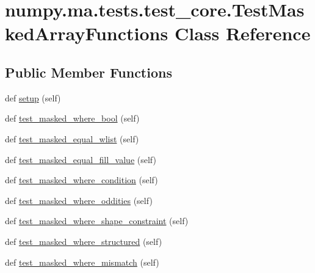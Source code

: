 \hypertarget{classnumpy_1_1ma_1_1tests_1_1test__core_1_1TestMaskedArrayFunctions}{}\section{numpy.\+ma.\+tests.\+test\+\_\+core.\+Test\+Masked\+Array\+Functions Class Reference}
\label{classnumpy_1_1ma_1_1tests_1_1test__core_1_1TestMaskedArrayFunctions}
\subsection*{Public Member Functions}
\begin{DoxyCompactItemize}
\item 
def \hyperlink{classnumpy_1_1ma_1_1tests_1_1test__core_1_1TestMaskedArrayFunctions_a5c8c6c625e1fbe0e50cfb13814790b3b}{setup} (self)
\item 
def \hyperlink{classnumpy_1_1ma_1_1tests_1_1test__core_1_1TestMaskedArrayFunctions_a41b1c34457ee73b016c4c9184f096a82}{test\+\_\+masked\+\_\+where\+\_\+bool} (self)
\item 
def \hyperlink{classnumpy_1_1ma_1_1tests_1_1test__core_1_1TestMaskedArrayFunctions_a88cedbe77f2bb72a1a40c3311ba18333}{test\+\_\+masked\+\_\+equal\+\_\+wlist} (self)
\item 
def \hyperlink{classnumpy_1_1ma_1_1tests_1_1test__core_1_1TestMaskedArrayFunctions_a89fa7576aafab74a7337fca8772003e2}{test\+\_\+masked\+\_\+equal\+\_\+fill\+\_\+value} (self)
\item 
def \hyperlink{classnumpy_1_1ma_1_1tests_1_1test__core_1_1TestMaskedArrayFunctions_a0a3fc1f07c7430cf69fe0bf5cb39a4c4}{test\+\_\+masked\+\_\+where\+\_\+condition} (self)
\item 
def \hyperlink{classnumpy_1_1ma_1_1tests_1_1test__core_1_1TestMaskedArrayFunctions_a5994f58086ce8dcd56668a796c3ae998}{test\+\_\+masked\+\_\+where\+\_\+oddities} (self)
\item 
def \hyperlink{classnumpy_1_1ma_1_1tests_1_1test__core_1_1TestMaskedArrayFunctions_aaa41b3955b246dee36d3677c87c4aba9}{test\+\_\+masked\+\_\+where\+\_\+shape\+\_\+constraint} (self)
\item 
def \hyperlink{classnumpy_1_1ma_1_1tests_1_1test__core_1_1TestMaskedArrayFunctions_ad75760930d694681e797a0b07d207ac4}{test\+\_\+masked\+\_\+where\+\_\+structured} (self)
\item 
def \hyperlink{classnumpy_1_1ma_1_1tests_1_1test__core_1_1TestMaskedArrayFunctions_a3de83e6aea018a50ebba3cfdfae4635c}{test\+\_\+masked\+\_\+where\+\_\+mismatch} (self)

\end{DoxyCompactItemize}
